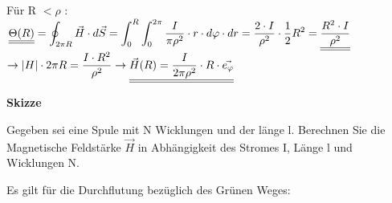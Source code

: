 	Für R $ < \rho $ : \\
	$\displaystyle  \underline{\underline{\Theta(R)}} =  \oint_{2\pi R} \vec{H} \cdot d\vec{S} =\int_{0}^{R} \int_{0}^{2\pi} \frac{I}{\pi{\rho}^2} \cdot r \cdot d\varphi  \cdot dr  = \frac{2 \cdot I}{\rho^2} \cdot \frac{1}{2} R^2 =  \underline{\underline{\frac{R^2\cdot I}{\rho^2}}} 		  $ \\
	$ \displaystyle \rightarrow |H| \cdot 2 \pi R = \frac{I \cdot R^2}{\rho^2} \rightarrow \underline{\underline{\vec{H}(R) = \frac{I}{2\pi \rho^2} \cdot R \cdot \vec{e_{\varphi}}}} $

	\textbf{Skizze}
	\begin{center}
	\end{center}
	\iend


	\beginbsp
	Gegeben sei eine Spule mit N Wicklungen und der länge l. Berechnen Sie die Magnetische Feldstärke $\vec{H}$ in Abhängigkeit des Stromes I, Länge l und Wicklungen N.
	\iend

	\beginbsp
	Es gilt für die Durchflutung bezüglich des Grünen Weges:

		\begin{center}
		\end{center}





